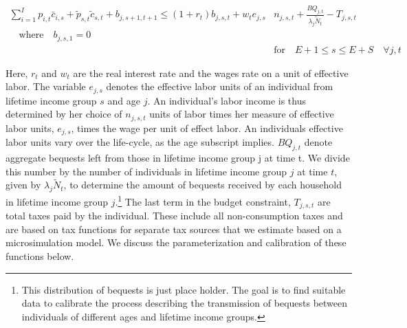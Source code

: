     \begin{equation}\label{EqBC}
      \begin{split}
        \sum_{i=1}^{I} p_{i,t}\bar{c}_{i,s} + \tilde{p}_{s,t}\tilde{c}_{s,t} + b_{j,s+1,t+1} \leq \left(1 + r_t\right) b_{j,s,t} + w_t e_{j,s}&n_{j,s,t} + \frac{BQ_{j,t}}{\lambda_j\tilde{N}_t} - T_{j,s,t} \\
        \quad\text{where}\quad b_{j,s,1} = 0 \\
        &\text{for} \quad E+1\leq s \leq E+S \quad \forall j,t
      \end{split}
    \end{equation}

\noindent\noindent Here, $r_{t}$ and $w_{t}$ are the real interest rate and the wages rate on a unit of effective labor.  The variable $e_{j,s}$ denotes the effective labor units of an individual from lifetime income group $s$ and age $j$.  An individual's labor income is thus determined by her choice of $n_{j,s,t}$ units of labor times her measure of effective labor units, $e_{j,s}$, times the wage per unit of effect labor.  An individuals effective labor units vary over the life-cycle, as the age subscript implies.  $BQ_{j,t}$ denote aggregate bequests left from those in lifetime income group {j} at time {t}.  We divide this number by the number of individuals in lifetime income group $j$ at time $t$, given by $\lambda_{j}\tilde{N}_{t}$, to determine the amount of bequests received by each household in lifetime income group $j$.\footnote{This distribution of bequests is just place holder. The goal is to find suitable data to calibrate the process describing the transmission of bequests between individuals of different ages and lifetime income groups.}  The last term in the budget constraint, $T_{j,s,t}$ are total taxes paid by the individual.  These include all non-consumption taxes and are based on tax functions for separate tax sources that we estimate based on a microsimulation model.  We discuss the parameterization and calibration of these functions below. 

